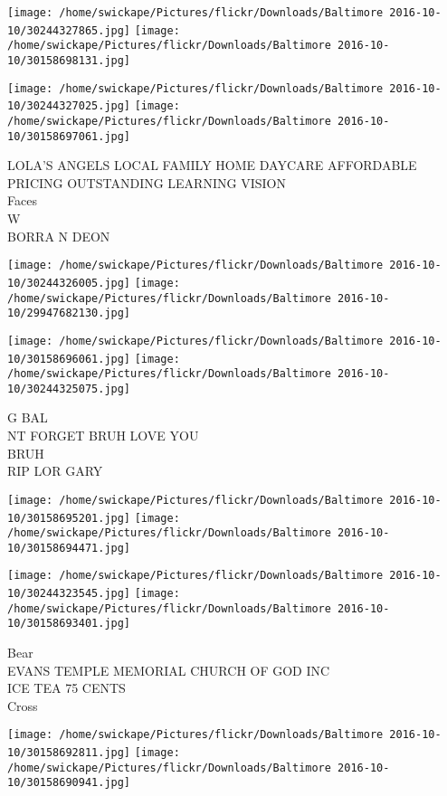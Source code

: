\documentclass[10pt,letterpaper]{article}
\begin{document}
\texttt{[image: /home/swickape/Pictures/flickr/Downloads/Baltimore 2016-10-10/30244327865.jpg]}
\texttt{[image: /home/swickape/Pictures/flickr/Downloads/Baltimore 2016-10-10/30158698131.jpg]}

\texttt{[image: /home/swickape/Pictures/flickr/Downloads/Baltimore 2016-10-10/30244327025.jpg]}
\texttt{[image: /home/swickape/Pictures/flickr/Downloads/Baltimore 2016-10-10/30158697061.jpg]}

LOLA'S ANGELS LOCAL FAMILY HOME DAYCARE AFFORDABLE PRICING OUTSTANDING LEARNING VISION\\
Faces\\
W\\
BORRA N DEON\\
\pagebreak

\texttt{[image: /home/swickape/Pictures/flickr/Downloads/Baltimore 2016-10-10/30244326005.jpg]}
\texttt{[image: /home/swickape/Pictures/flickr/Downloads/Baltimore 2016-10-10/29947682130.jpg]}

\texttt{[image: /home/swickape/Pictures/flickr/Downloads/Baltimore 2016-10-10/30158696061.jpg]}
\texttt{[image: /home/swickape/Pictures/flickr/Downloads/Baltimore 2016-10-10/30244325075.jpg]}

G BAL\\
NT FORGET BRUH LOVE YOU\\
BRUH\\
RIP LOR GARY\\
\pagebreak

\texttt{[image: /home/swickape/Pictures/flickr/Downloads/Baltimore 2016-10-10/30158695201.jpg]}
\texttt{[image: /home/swickape/Pictures/flickr/Downloads/Baltimore 2016-10-10/30158694471.jpg]}

\texttt{[image: /home/swickape/Pictures/flickr/Downloads/Baltimore 2016-10-10/30244323545.jpg]}
\texttt{[image: /home/swickape/Pictures/flickr/Downloads/Baltimore 2016-10-10/30158693401.jpg]}

Bear\\
EVANS TEMPLE MEMORIAL CHURCH OF GOD INC\\
ICE TEA 75 CENTS\\
Cross\\
\pagebreak

\texttt{[image: /home/swickape/Pictures/flickr/Downloads/Baltimore 2016-10-10/30158692811.jpg]}
\texttt{[image: /home/swickape/Pictures/flickr/Downloads/Baltimore 2016-10-10/30158690941.jpg]}
\end{document}
